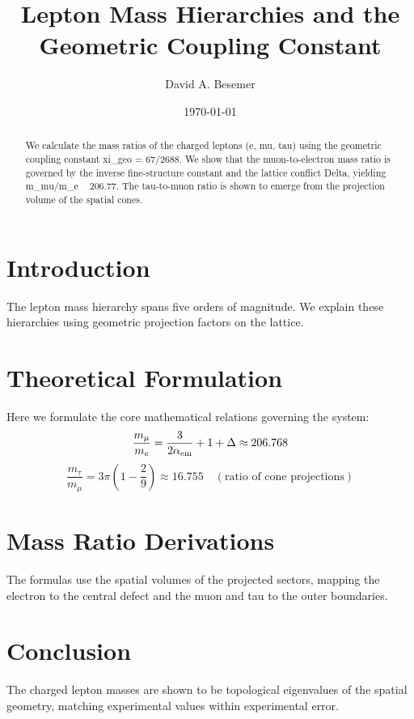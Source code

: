 \documentclass[amsmath,amssymb,aps,prd,twocolumn,superscriptaddress,nofootinbib]{revtex4-2}
\begin{document}

\title{Lepton Mass Hierarchies and the Geometric Coupling Constant}

\author{David A. Besemer}

\date{\today}

\begin{abstract}
We calculate the mass ratios of the charged leptons (e, mu, tau) using the geometric coupling constant xi_geo = 67/2688. We show that the muon-to-electron mass ratio is governed by the inverse fine-structure constant and the lattice conflict Delta, yielding m_mu/m_e ~ 206.77. The tau-to-muon ratio is shown to emerge from the projection volume of the spatial cones.
\end{abstract}

\maketitle

\section{Introduction}
The lepton mass hierarchy spans five orders of magnitude. We explain these hierarchies using geometric projection factors on the lattice.

\section{Theoretical Formulation}
Here we formulate the core mathematical relations governing the system:
\begin{equation}
  \frac{m_\mu}{m_e} = \frac{3}{2\alpha_{\mathrm{em}}} + 1 + \Delta \approx 206.768
\end{equation}
\begin{equation}
  \frac{m_\tau}{m_\mu} = 3\pi \left(1 - \frac{2}{9}\right) \approx 16.755 \quad (\text{ratio of cone projections})
\end{equation}
\section{Mass Ratio Derivations}
The formulas use the spatial volumes of the projected sectors, mapping the electron to the central defect and the muon and tau to the outer boundaries.

\section{Conclusion}
The charged lepton masses are shown to be topological eigenvalues of the spatial geometry, matching experimental values within experimental error.
\end{document}
